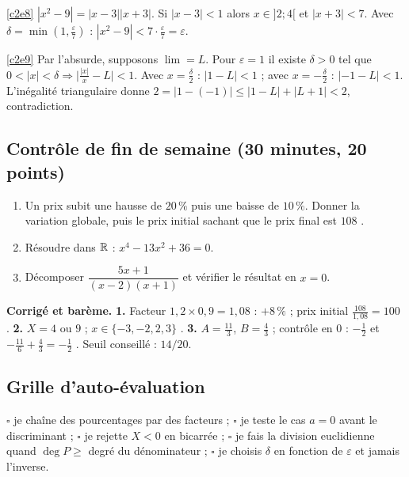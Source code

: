 \begin{corrige}{\ref{c2e8}}
$|x^2-9|=|x-3||x+3|$. Si $|x-3|<1$ alors $x\in]2;4[$ et $|x+3|<7$. Avec $\delta=\min(1,\frac\varepsilon7)$ : $|x^2-9|<7\cdot\frac\varepsilon7=\varepsilon$.
\end{corrige}
\begin{corrige}{\ref{c2e9}}
Par l'absurde, supposons $\lim=L$. Pour $\varepsilon=1$ il existe $\delta>0$ tel que $0<|x|<\delta\Rightarrow\big|\frac{|x|}x-L\big|<1$. Avec $x=\frac\delta2$ : $|1-L|<1$ ; avec $x=-\frac\delta2$ : $|-1-L|<1$. L'inégalité triangulaire donne $2=|1-(-1)|\le|1-L|+|L+1|<2$, contradiction.
\end{corrige}
\else{}\fi

\subsection{Contrôle de fin de semaine (30 minutes, 20 points)}
\begin{enumerate}
 \item {} Un prix subit une hausse de $20\,\%$ puis une baisse de $10\,\%$. Donner la variation globale, puis le prix initial sachant que le prix final est $108$ \texteuro.
 \item {} Résoudre dans $\mathbb{R}$ : $x^4-13x^2+36=0$.
 \item {} Décomposer $\dfrac{5x+1}{(x-2)(x+1)}$ et vérifier le résultat en $x=0$.
\end{enumerate}
\ifcorr
\textbf{Corrigé et barème.} \textbf{1.} Facteur $1{,}2\times0{,}9=1{,}08$ : $+8\,\%$  ; prix initial $\frac{108}{1{,}08}=100$ \texteuro{} . \textbf{2.} $X=4$ ou $9$  ; $x\in\{-3,-2,2,3\}$ . \textbf{3.} $A=\frac{11}3$, $B=\frac43$  ; contrôle en $0$ : $-\frac12$ et $-\frac{11}6+\frac43=-\frac12$ . Seuil conseillé : $14/20$.
\fi

\subsection{Grille d'auto-évaluation}
$\square$ je chaîne des pourcentages par des facteurs ; $\square$ je teste le cas $a=0$ avant le discriminant ; $\square$ je rejette $X<0$ en bicarrée ; $\square$ je fais la division euclidienne quand $\deg P\ge$ degré du dénominateur ; $\square$ je choisis $\delta$ en fonction de $\varepsilon$ et jamais l'inverse.
